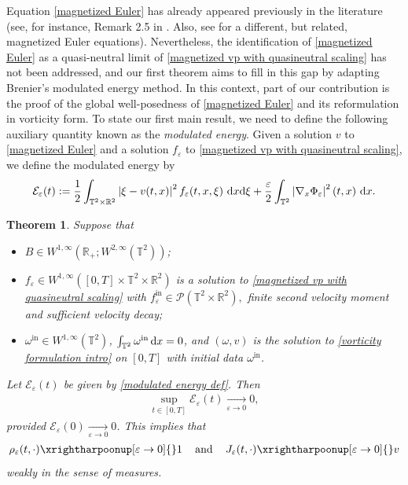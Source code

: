 \documentclass[11pt,reqno]{amsart}
\newtheorem{thm}{Theorem}[section]
\numberwithin{equation}{section}
\def\dd{{\rm d}}
\begin{document}
Equation \eqref{magnetized Euler} has already appeared previously in the literature 
(see, for instance, Remark 2.5 in \cite{rege2025stability}. 
Also, see  \cite{gallagher2005pressureless} for a different, but related, 
magnetized Euler equations). 
Nevertheless, the identification of \eqref{magnetized Euler} as a quasi-neutral limit 
of \eqref{magnetized vp with quasineutral scaling} has not been addressed, 
and our first theorem aims to fill in this gap by adapting Brenier's modulated 
energy method. 
In this context, part of our contribution is the proof of the global well-posedness 
of \eqref{magnetized Euler} and its reformulation in vorticity form. 
To state our first main result, we need to define the following auxiliary quantity known as the \textit{modulated energy}. 
Given a solution $v$ to \eqref{magnetized Euler} and a solution $f_{\varepsilon}$ 
to \eqref{magnetized vp with quasineutral scaling}, we define the modulated energy by 
\begin{align}
\mathcal{E}_{\varepsilon}(t):= \frac{1}{2}\int_{\mathbb{T}^{2}\times \mathbb{R}^{2}} \left\vert \xi-v(t,x)\right\vert^{2}f_{\varepsilon}(t,x,\xi)\ \dd x\dd \xi + \frac{\varepsilon}{2}\int_{\mathbb{T}^{2}} \left\vert \nabla_{x}\Phi_{\varepsilon}\right\vert^{2}(t,x) \ \dd x. \label{modulated energy def}    
\end{align}

\begin{thm}\label{main thm 1}
Suppose that 
\begin{itemize}
\item[{\rm(i)}] $B\in W^{1,\infty}(\mathbb{R}_{+};W^{2,\infty}(\mathbb{T}^{2}))${\rm;}
\item[{\rm(ii)}]
$f_{\varepsilon}\in W^{1,\infty}([0,T]\times \mathbb{T}
    ^{2}\times \mathbb{R}^{2})$ is a solution to \eqref{magnetized vp with quasineutral scaling} with $f^{\mathrm{in}}_{\varepsilon}\in \mathcal{P}(\mathbb{T}^{2}\times \mathbb
    {R}
    ^{2}),$ finite second velocity moment and sufficient velocity decay{\rm;}
\item[{\rm(iii)}]
    $\omega^{\mathrm{in}}\in W^{1,\infty}( \mathbb{T}^{2})$, 
    $\int_{\mathbb T^2}\omega^{\mathrm{in}}\,\dd x=0$,  
    and $(\omega,v)$ is the solution to \eqref{vorticity formulation intro}  on $[0,T]$ with initial data $\omega^{\mathrm{in}}$. 
\end{itemize}
 Let $\mathcal{E}_{\varepsilon}(t)$ be given by \eqref{modulated energy def}.
Then
\begin{align*}
\underset{t\in [0,T]}{\sup} \mathcal{E}_{\varepsilon}(t)\underset{\varepsilon \rightarrow 0}{\longrightarrow}0,
\end{align*}
provided $\mathcal{E}_{\varepsilon}(0)\underset{\varepsilon \rightarrow 0}{\longrightarrow}0$.    
This implies that
\begin{align*}
\rho_{\varepsilon}(t,\cdot)\xrightharpoonup[\varepsilon \rightarrow 0]{}1\quad\, 
\mbox{and} \quad\, J_{\varepsilon}(t,\cdot)
\xrightharpoonup[\varepsilon \rightarrow 0]{}v
\end{align*}
weakly in the sense of measures.  
\end{thm}
\end{document}
